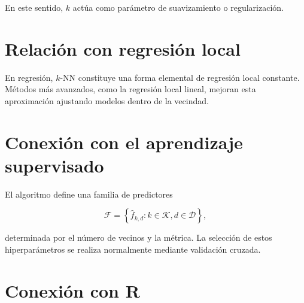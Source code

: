 \documentclass[
  spanish,
  10.5pt,
  letterpaper,
  DIV=11,
  numbers=noendperiod,
  oneside,
  open=any]{scrreprt}
\theoremstyle{definition}
\theoremstyle{definition}
\theoremstyle{plain}
\theoremstyle{remark}
\begin{document}
En este sentido, \(k\) actúa como parámetro de suavizamiento o
regularización.

\section*{Relación con regresión
local}\label{relaciuxf3n-con-regresiuxf3n-local}


En regresión, \(k\)-NN constituye una forma elemental de regresión local
constante. Métodos más avanzados, como la regresión local lineal,
mejoran esta aproximación ajustando modelos dentro de la vecindad.

\section*{Conexión con el aprendizaje
supervisado}\label{conexiuxf3n-con-el-aprendizaje-supervisado}


El algoritmo define una familia de predictores

\[
\mathcal{F}
=
\left\{
\widehat{f}_{k,d}: k\in\mathcal{K}, d\in\mathcal{D}
\right\},
\]

determinada por el número de vecinos y la métrica. La selección de estos
hiperparámetros se realiza normalmente mediante validación cruzada.

\section*{Conexión con R}\label{conexiuxf3n-con-r-10}

\end{document}

